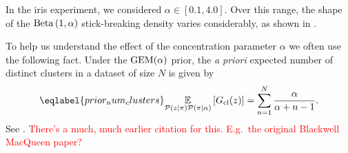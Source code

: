 In the iris experiment, we considered $\alpha\in[0.1, 4.0]$.
Over this range, the shape of
the $\mathrm{Beta}\left(1, \alpha\right)$ stick-breaking density varies considerably, as shown in
.

\BetaPriorsEx

To help us understand the effect of the concentration parameter
$\alpha$ we often use the following fact. Under the $\mathrm{GEM}(\alpha)$ prior, the {\em a priori} expected
number of distinct clusters in a dataset of size $N$ is given by
%
\begin{align}\eqlabel{prior_num_clusters}
\expect{\p(\z \vert \pi)\p(\pi \vert \alpha)}{\nclusters(\z)} =
\sum_{\n = 1}^\N \frac{\alpha}{\alpha + \n - 1}.
\end{align}
%
See \citep[Equation 75]{jordan:2015:gentleintrodp}. \textcolor{red}{There's a much, much earlier citation for this. E.g.\ the original Blackwell MacQueen paper?}
